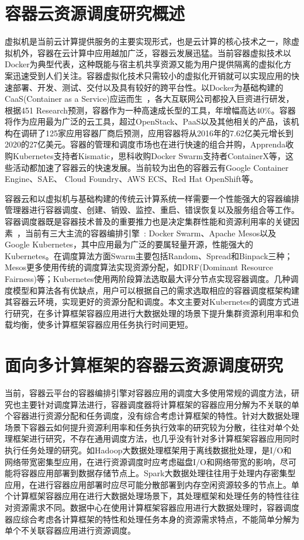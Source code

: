 \section{容器云资源调度研究概述}
虚拟机是当前云计算提供服务的主要实现形式，也是云计算的核心技术之一，除虚拟机外，容器在云计算中应用越加广泛，容器云发展迅猛。当前容器虚拟技术以Docker为典型代表，这种既能与宿主机共享资源又能为用户提供隔离的虚拟化方案迅速受到人们关注。容器虚拟化技术只需较小的虚拟化开销就可以实现应用的快速部署、开发、测试、交付以及具有较好的跨平台性。以Docker为基础构建的CaaS(Container as a Service)应运而生~\cite{Kozhirbayev2017A}，各大互联网公司都投入巨资进行研发，根据451 Research预测，容器作为一种高速成长型的工具，年增幅高达40\%。容器将作为应用最为广泛的云工具，超过OpenStack、PaaS以及其他相关的产品，该机构在调研了125家应用容器厂商后预测，应用容器将从2016年的7.62亿美元增长到2020的27亿美元。容器的管理和调度市场也在进行快速的组合并购，Apprenda收购Kubernetes支持者Kismatic，思科收购Docker Swarm支持者ContainerX等，这些活动都加速了容器云的快速发展。当前较为出色的容器云有Google Container Engine、SAE、 Cloud Foundry、AWS ECS、Red Hat OpenShift等。

容器云和以虚拟机与基础构建的传统云计算系统一样需要一个性能强大的容器编排管理器进行容器调度、创建、销毁、监控、重启、错误恢复以及服务组合等工作。容器调度器既是容器技术普及的重要推力也是决定集群性能和资源利用率的关键因素~\cite{Application2017}，当前有三大主流的容器编排引擎~\cite{Usman2016}: Docker Swarm、Apache Mesos以及Google Kubernetes，其中应用最为广泛的要属轻量开源，性能强大的Kubernetes。在调度算法方面Swarm主要包括Random、Spread和Binpack三种；Mesos更多使用传统的调度算法实现资源分配，如DRF(Dominant Resource Fairness)等；Kubernetes使用两阶段算法选取最大评分节点实现容器调度。几种调度模型和算法各有优缺点，用户可以根据自己的需求选取相应的容器调度框架构建其容器云环境，实现更好的资源分配和调度。本文主要对Kubernetes的调度方式进行研究，在多计算框架容器应用进行大数据处理的场景下提升集群资源利用率和负载均衡，使多计算框架容器应用任务执行时间更短。

\section{面向多计算框架的容器云资源调度研究}
当前，容器云平台的容器编排引擎对容器应用的调度大多使用常规的调度方法，研究也主要针对调度算法进行，容器调度器将计算框架的容器应用分解为不关联的单个容器进行资源分配和任务调度，没有综合考虑计算框架的特性。针对大数据处理场景下容器云如何提升资源利用率和任务执行效率的研究较为分散，往往对单个处理框架进行研究，不存在通用调度方法，也几乎没有针对多计算框架容器应用同时执行任务处理的研究。如Hadoop大数据处理框架用于离线数据批处理，是I/O和网络带宽密集型应用，在进行资源调度时应考虑磁盘I/O和网络带宽的影响，尽可能将容器应用部署到数据存储节点上。Spark大数据处理往往用于处理内存密集型应用，在进行容器应用部署时应尽可能分散部署到内存空闲资源较多的节点上。单个计算框架容器应用在进行大数据处理场景下，其处理框架和处理任务的特性往往对资源需求不同。数据中心在使用计算框架容器应用进行大数据处理时，容器调度器应综合考虑各计算框架的特性和处理任务本身的资源需求特点，不能简单分解为单个不关联容器应用进行资源调度。

